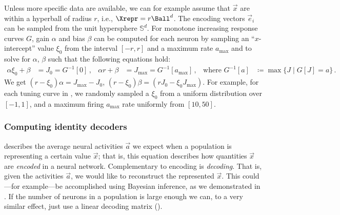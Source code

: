 Unless more specific data are available, we can for example assume that $\vec x$ are within a hyperball of radius $r$, i.e., $\Xrepr = r \Ball^d$.
The encoding vectors $\vec e_i$ can be sampled from the unit hypersphere $\mathbb{S}^d$.
For monotone increasing response curves $G$, gain $\alpha$ and bias $\beta$ can be computed for each neuron by sampling an \enquote{$x$-intercept} value $\xi_0$ from the interval $[-r, r]$ and a maximum rate $a_\mathrm{max}$ and to solve for $\alpha$, $\beta$ such that the following equations hold:
\begin{align*}
	\alpha \xi_0 + \beta &= J_0 = G^{-1}[0] \,, &
	\alpha r + \beta &= J_\mathrm{max} = G^{-1}[a_\mathrm{max}] \,, & \text{where } G^{-1}[a] &\coloneqq \max \big\{ J \mid G[J] = a \big\} \,.
\end{align*}
We get $(r - \xi_0) \alpha = J_\mathrm{max} - J_0$, $(r - \xi_0) \beta = (r J_0 - \xi_0 J_\mathrm{max})$.
For example, for each tuning curve in , we randomly sampled a $\xi_0$ from a uniform distribution over $[-1, 1]$, and a maximum firing $a_\mathrm{max}$ rate uniformly from $[10, 50]$.

\subsubsection{Computing identity decoders}
 describes the average neural activities $\vec a$ we expect when a population is representing a certain value $\vec x$; that is, this equation describes how quantities $\vec x$ are \emph{encoded} in a neural network.
Complementary to encoding is \emph{decoding}.
That is, given the activities $\vec a$, we would like to reconstruct the represented $\vec x$.
This could---for example---be accomplished using Bayesian inference, as we demonstrated in .
If the number of neurons \Npop in a population is large enough we can, to a very similar effect, just use a linear decoding matrix \Dec ().

